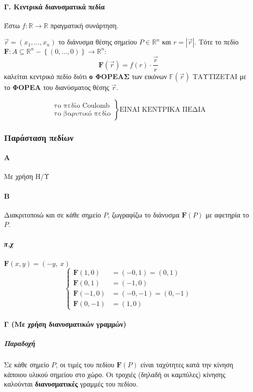\documentclass[11pt,a4paper,titlepage]{article}
\newcommand{\textlatin}[1]{#1}
\begin{document}
\paragraph{Γ. Κεντρικά διανυσματικά πεδία}
Έστω $f: \mathbb{R} \to \mathbb{R}$ πραγματική συνάρτηση.

\(\vec r = (x_1,\dots,x_n)\) το διάνυσμα θέσης σημείου $P \in \mathbb R^n$ και $r=|\vec r|$. Τότε το πεδίο $\mathbf F: A \subseteq \mathbb R^n - \left\lbrace (0,\dots,0) \right\rbrace \to \mathbb R^n:$
\[
\boxed{
	\mathbf F(\vec r) = f(r) \cdot \frac{\vec r}{r}
	}
\] καλείται κεντρικό πεδίο διότι \textbf{ο ΦΟΡΕΑΣ} των εικόνων $\mathbb F(\vec r)$ ΤΑΥΤΙΖΕΤΑΙ με το \textbf{ΦΟΡΕΑ} του διανύσματος θέσης $\vec r$.

\[
\left.
\begin{matrix}
\text{το πεδίο \textlatin{Coulomb}}\\
\text{το βαρυτικό πεδίο}
\end{matrix}
\right\rbrace \text{ΕΙΝΑΙ ΚΕΝΤΡΙΚΑ ΠΕΔΙΑ}
\]

\subsubsection{Παράσταση πεδίων}
\paragraph{Α} Με χρήση Η/Υ

\paragraph{Β}
Διακριτοποιώ και σε κάθε σημείο $P$, ζωγραφίζω το διάνυσμα $\mathbf F(P)$ με αφετηρία το $P$.
\subparagraph{π.χ} \(\mathbf F(x,y) = (-y,\ x) \)
\[
\begin{cases}
\mathbf F(1,0) &= (-0,1) = (0,1) \\
\mathbf F(0,1) &= (-1,0) \\
\mathbf F(-1,0) &= (-0,-1) = (0,-1) \\
\mathbf F(0,-1) &= (1,0)
\end{cases}
\]

\paragraph{Γ (Με χρήση διανυσματικών γραμμών)}

\subparagraph{Παραδοχή}
Σε κάθε σημείο $P$, οι τιμές του πεδίου $\mathbf F(P)$ είναι ταχύτητες κατά την κίνηση κάποιου υλικού σημείου στο χώρο. Οι τροχιές (δηλαδή οι καμπύλες) κίνησης καλούνται \textbf{διανυσματικές} γραμμές του πεδίου.
\end{document}
